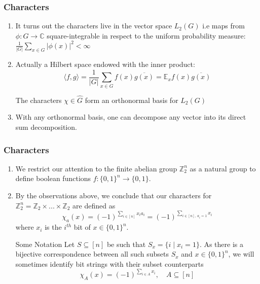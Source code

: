 \documentclass{beamer}
\begin{document}
\begin{frame}
\frametitle{Characters}
  \begin{enumerate}
    \item It turns out the characters live in the vector space $L_2(G)$ i.e maps from $\phi: G \rightarrow \mathbb{C}$ square-integrable in respect to the uniform probability measure: $\frac{1}{|G|}\sum_{x \in G} |\phi(x)|^2 < \infty$
    \item Actually a Hilbert space endowed with the inner product:
    $$ \langle f,g \rangle = \frac{1}{|G|}\sum_{x\in G} f(x)\overline{g(x)}= \mathbb{E}_x f(x)\overline{g(x)} $$
    \begin{theorem}
      The characters $\chi \in \hat{G}$ form an orthonormal basis for $L_2(G)$
    \end{theorem}
    \item
    With any orthonormal basis, one can decompose any vector into its direct sum decomposition.
  \end{enumerate}
\end{frame}

\begin{frame}
\frametitle{Characters}
  \begin{enumerate}
    \item We restrict our attention to the finite abelian group $\mathbb{Z}_2^n$ as a natural group to define boolean functions $f: \{0,1\}^n \rightarrow \{0,1\}$.
    \item By the observations above, we conclude that our characters for $\mathbb{Z}_2^n = \mathbb{Z}_2 \times ... \times \mathbb{Z}_2$ are defined as
    $$  \chi_a(x) = (-1)^{\sum_{i \in [n]} x_ia_i} = (-1)^{\sum_{i \in [n], \; a_i = 1} x_i}$$
    where $x_i$ is the $i^{th}$ bit of $x \in \{0,1\}^n$.
    \begin{block}{Some Notation}
      Let $S \subseteq [n]$ be such that $S_x = \{i \mid x_i = 1\}$. As there is a bijective correspondence between all such subsets $S_x$ and $x \in \{0,1\}^n$, we will sometimes identify bit strings with their subset counterparts
      $$ \chi_A(x) = (-1)^{\sum_{i \in A} x_i}, \quad A \subseteq [n]$$
    \end{block}
  \end{enumerate}
\end{frame}
\end{document}
